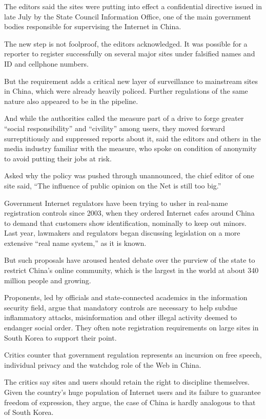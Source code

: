 ﻿\documentclass[12pt]{article}
\begin{document}
The editors said the sites were putting into effect a confidential directive issued in late July by
the State Council Information Office, one of the main government bodies responsible for supervising
the Internet in China.

The new step is not foolproof, the editors acknowledged. It was possible for a reporter to register
successfully on several major sites under falsified names and ID and cellphone numbers.

But the requirement adds a critical new layer of surveillance to mainstream sites in China, which
were already heavily policed. Further regulations of the same nature also appeared to be in the
pipeline.

And while the authorities called the measure part of a drive to forge greater ``social
responsibility'' and ``civility'' among users, they moved forward surreptitiously and suppressed
reports about it, said the editors and others in the media industry familiar with the measure, who
spoke on condition of anonymity to avoid putting their jobs at risk.

Asked why the policy was pushed through unannounced, the chief editor of one site said, ``The
influence of public opinion on the Net is still too big.''

Government Internet regulators have been trying to usher in real-name registration controls since
2003, when they ordered Internet cafes around China to demand that customers show identification,
nominally to keep out minors. Last year, lawmakers and regulators began discussing legislation on a
more extensive ``real name system,'' as it is known.

But such proposals have aroused heated debate over the purview of the state to restrict China's
online community, which is the largest in the world at about 340 million people and growing.

Proponents, led by officials and state-connected academics in the information security field, argue
that mandatory controls are necessary to help subdue inflammatory attacks, misinformation and other
illegal activity deemed to endanger social order. They often note registration requirements on large
sites in South Korea to support their point.

Critics counter that government regulation represents an incursion on free speech, individual
privacy and the watchdog role of the Web in China.

The critics say sites and users should retain the right to discipline themselves. Given the
country's huge population of Internet users and its failure to guarantee freedom of expression, they
argue, the case of China is hardly analogous to that of South Korea.
\end{document}
